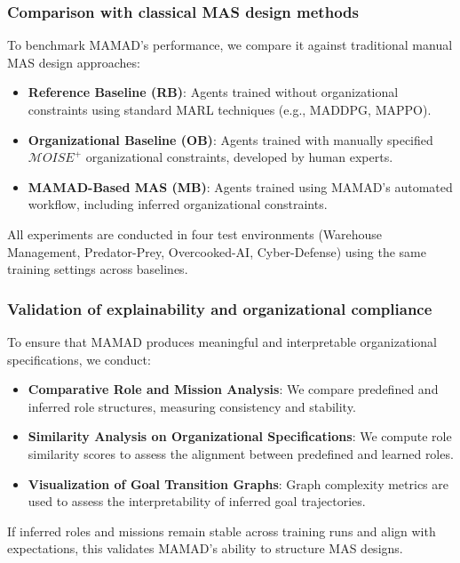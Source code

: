 \documentclass[pdflatex,sn-mathphys-num]{sn-jnl}%
\theoremstyle{thmstyleone}%
\theoremstyle{thmstyletwo}%
\theoremstyle{thmstylethree}%
\begin{document}
\subsubsection{Comparison with classical MAS design methods}
To benchmark MAMAD's performance, we compare it against traditional manual MAS design approaches:
\begin{itemize}
    \item \textbf{Reference Baseline (RB)}: Agents trained without organizational constraints using standard MARL techniques (e.g., MADDPG, MAPPO).
    \item \textbf{Organizational Baseline (OB)}: Agents trained with manually specified $\mathcal{M}OISE^+$ organizational constraints, developed by human experts.
    \item \textbf{MAMAD-Based MAS (MB)}: Agents trained using MAMAD's automated workflow, including inferred organizational constraints.
\end{itemize}

All experiments are conducted in four test environments (Warehouse Management, Predator-Prey, Overcooked-AI, Cyber-Defense) using the same training settings across baselines.

\subsubsection{Validation of explainability and organizational compliance}
To ensure that MAMAD produces meaningful and interpretable organizational specifications, we conduct:
\begin{itemize}
    \item \textbf{Comparative Role and Mission Analysis}: We compare predefined and inferred role structures, measuring consistency and stability.
    \item \textbf{Similarity Analysis on Organizational Specifications}: We compute role similarity scores to assess the alignment between predefined and learned roles.
    \item \textbf{Visualization of Goal Transition Graphs}: Graph complexity metrics are used to assess the interpretability of inferred goal trajectories.
\end{itemize}

If inferred roles and missions remain stable across training runs and align with expectations, this validates MAMAD's ability to structure MAS designs.
\end{document}
